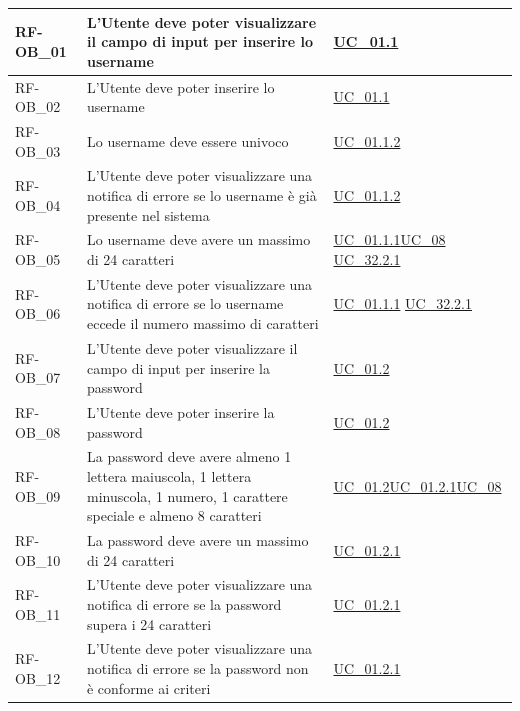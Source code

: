 \begin{longtable}{|>{\raggedright}p{}|>{\raggedright\arraybackslash}p{}|>{\raggedright\arraybackslash}p{}|}
	\hline
	RF-OB\_01 \hypertarget{rf-ob_1} & L'Utente deve poter visualizzare il campo di input per inserire lo username & \hyperref[uc_01.1]{UC\_01.1} \\
	\hline
	RF-OB\_02 \hypertarget{rf-ob_2} & L'Utente deve poter inserire lo username & \hyperref[uc_01.1]{UC\_01.1} \\
	\hline
	RF-OB\_03 \hypertarget{rf-ob_3} & Lo username deve essere univoco & \hyperref[uc_01.1.2]{UC\_01.1.2} \\
	\hline
	RF-OB\_04 \hypertarget{rf-ob_4} & L'Utente deve poter visualizzare una notifica di errore se lo username è già presente nel sistema & \hyperref[uc_01.1.2]{UC\_01.1.2} \\
	\hline
	RF-OB\_05 \hypertarget{rf-ob_5} & Lo username deve avere un massimo di 24 caratteri & \hyperref[uc_01.1.1]{UC\_01.1.1}\newline \hyperref[uc_08]{UC\_08} \newline \hyperref[uc_32.2.1]{UC\_32.2.1}\\
	\hline
	RF-OB\_06 \hypertarget{rf-ob_6} & L'Utente deve poter visualizzare una notifica di errore se lo username eccede il numero massimo di caratteri & \hyperref[uc_01.1.1]{UC\_01.1.1} \newline \hyperref[uc_32.2.1]{UC\_32.2.1}\\
	\hline
	RF-OB\_07 \hypertarget{rf-ob_7} & L'Utente deve poter visualizzare il campo di input per inserire la password & \hyperref[uc_01.2]{UC\_01.2} \\
	\hline
	RF-OB\_08 \hypertarget{rf-ob_8} & L'Utente deve poter inserire la password & \hyperref[uc_01.2]{UC\_01.2}\\
	\hline
	RF-OB\_09 \hypertarget{rf-ob_9} & La password deve avere almeno 1 lettera maiuscola, 1 lettera minuscola, 1 numero, 1 carattere speciale e almeno 8 caratteri & \hyperref[uc_01.2]{UC\_01.2}\newline \hyperref[uc_01.2.1]{UC\_01.2.1}\newline \hyperref[uc_08]{UC\_08} \\
	\hline
	RF-OB\_10 \hypertarget{rf-ob_10} & La password deve avere un massimo di 24 caratteri & \hyperref[uc_01.2.1]{UC\_01.2.1} \\
	\hline
	RF-OB\_11 \hypertarget{rf-ob_11} & L'Utente deve poter visualizzare una notifica di errore se la password supera i 24 caratteri & \hyperref[uc_01.2.1]{UC\_01.2.1} \\
	\hline
	RF-OB\_12 \hypertarget{rf-ob_12} & L'Utente deve poter visualizzare una notifica di errore se la password non è conforme ai criteri & \hyperref[uc_01.2.1]{UC\_01.2.1} \\

\end{longtable}

